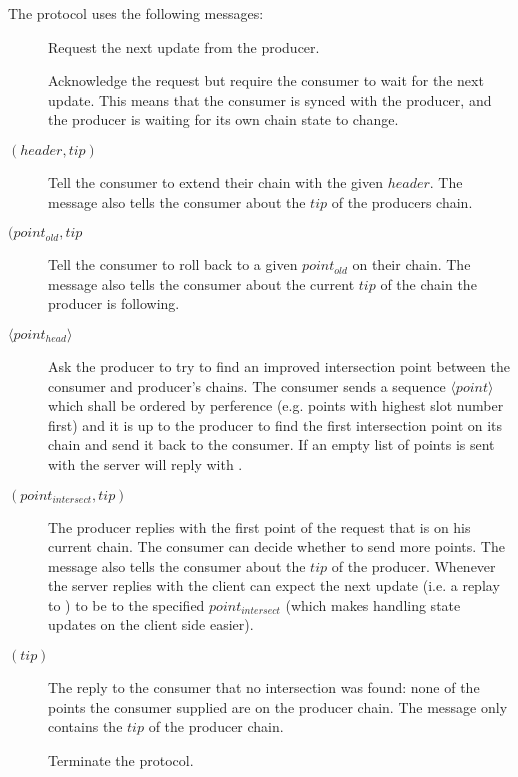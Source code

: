 The protocol uses the following messages:
\begin{description}
\item [\MsgRequestNext]
      Request the next update from the producer.
\item [\MsgAwaitReply]
      Acknowledge the request but require the consumer to wait for the next update.
      This means that the consumer is synced with the producer, and
      the producer is waiting for its own chain state to change.
\item [\MsgRollForward{} {\boldmath $(header, tip)$}]
      Tell the consumer to extend their chain with the given $header$.
      The message also tells the consumer about the $tip$ of the producers chain.
\item [\MsgRollBackward{} {\boldmath $(point_{old}, tip$}]
      Tell the consumer to roll back to a given $point_{old}$ on their chain.
      The message also tells the consumer about the current  $tip$ of the chain the producer is following.
\item [\MsgFindIntersect{} {\boldmath $\langle point_{head} \rangle $}]
      Ask the producer to try to find an improved intersection point between
      the consumer and producer's chains.
      The consumer sends a sequence {\boldmath $\langle point \rangle $} which
      shall be ordered by perference (e.g. points with highest slot number
      first) and it is up to the producer to find the first intersection point
      on its chain and send it back to the consumer.  If an empty list of
      points is sent with \MsgFindIntersect{} the server will reply with
      \MsgIntersectNotFound{}.
\item [\MsgIntersectFound{} {\boldmath $(point_{intersect} ,tip)$}]
      The producer replies with the first point of the request that is on his current chain.
      The consumer can decide whether to send more points.
      The message also tells the consumer about the $tip$ of the producer.
      Whenever the server replies with \MsgIntersectFound{} the client can
      expect the next update (i.e. a replay to \MsgRequestNext{}) to be
      \MsgRollBackward{} to the specified $point_{intersect}$ (which makes
      handling state updates on the client side easier).
\item [\MsgIntersectNotFound{} {\boldmath $(tip)$}]
      The reply to the consumer that no intersection was found: none of the
      points the consumer supplied are on the producer chain.
      The message only contains the $tip$ of the producer chain.
\item [\MsgDone]
      Terminate the protocol.
\end{description}

